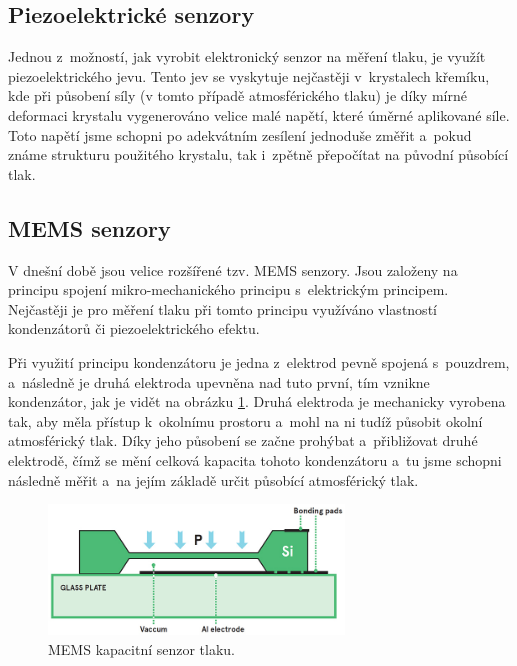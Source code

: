 \subsection{Piezoelektrické senzory}

Jednou z~možností, jak vyrobit elektronický senzor na měření tlaku, je využít piezoelektrického jevu. Tento jev se vyskytuje nejčastěji v~krystalech křemíku, kde při působení síly (v tomto případě atmosférického tlaku) je díky mírné deformaci krystalu vygenerováno velice malé napětí, které úměrné aplikované síle. Toto napětí jsme schopni po adekvátním zesílení jednoduše změřit a~pokud známe strukturu použitého krystalu, tak i~zpětně přepočítat na původní působící tlak.

\subsection{MEMS senzory}

V dnešní době jsou velice rozšířené tzv. MEMS senzory. Jsou založeny na principu spojení mikro-mechanického principu s~elektrickým principem. Nejčastěji je pro měření tlaku při tomto principu využíváno vlastností kondenzátorů či piezoelektrického efektu.

Při využití principu kondenzátoru je jedna z~elektrod pevně spojená s~pouzdrem, a~následně je druhá elektroda upevněna nad tuto první, tím vznikne kondenzátor, jak je vidět na obrázku \ref{fig_memsCapacitiveSensor}. Druhá elektroda je mechanicky vyrobena tak, aby měla přístup k~okolnímu prostoru a~mohl na ni tudíž působit okolní atmosférický tlak. Díky jeho působení se začne prohýbat a~přibližovat druhé elektrodě, čímž se mění celková kapacita tohoto kondenzátoru a~tu jsme schopni následně měřit a~na jejím základě určit působící atmosférický tlak.

\begin{figure}
    \centering
    \includegraphics[width=0.7\textwidth]{obrazky/MEMS_capacitive_sensor.jpg}
    \caption{MEMS kapacitní senzor tlaku. \cite{AvnetMEMS}}
    \label{fig_memsCapacitiveSensor}
\end{figure}


